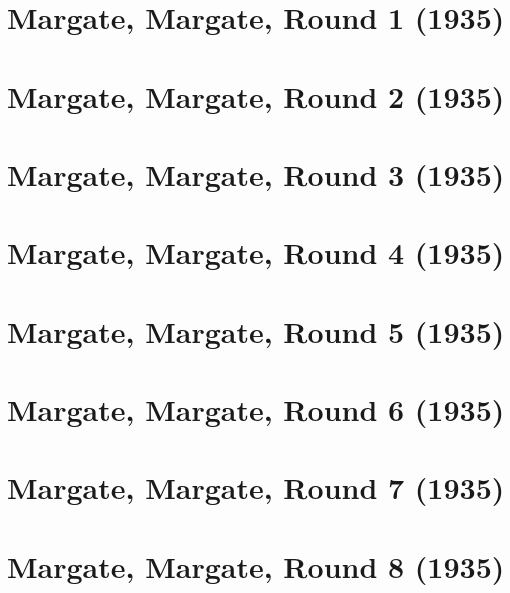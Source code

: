 \documentclass[11pt]{article}
\begin{document}
\clearpage

\section{Margate, Margate, Round 1 (1935)}


\clearpage

\section{Margate, Margate, Round 2 (1935)}


\clearpage

\section{Margate, Margate, Round 3 (1935)}


\clearpage

\section{Margate, Margate, Round 4 (1935)}


\clearpage

\section{Margate, Margate, Round 5 (1935)}


\clearpage

\section{Margate, Margate, Round 6 (1935)}


\clearpage

\section{Margate, Margate, Round 7 (1935)}


\clearpage

\section{Margate, Margate, Round 8 (1935)}


\clearpage
\end{document}
